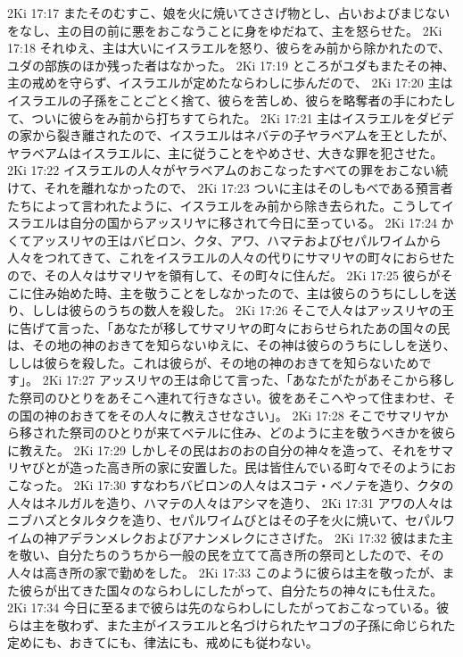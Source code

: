 2Ki 17:17  またそのむすこ、娘を火に焼いてささげ物とし、占いおよびまじないをなし、主の目の前に悪をおこなうことに身をゆだねて、主を怒らせた。
2Ki 17:18  それゆえ、主は大いにイスラエルを怒り、彼らをみ前から除かれたので、ユダの部族のほか残った者はなかった。
2Ki 17:19  ところがユダもまたその神、主の戒めを守らず、イスラエルが定めたならわしに歩んだので、
2Ki 17:20  主はイスラエルの子孫をことごとく捨て、彼らを苦しめ、彼らを略奪者の手にわたして、ついに彼らをみ前から打ちすてられた。
2Ki 17:21  主はイスラエルをダビデの家から裂き離されたので、イスラエルはネバテの子ヤラベアムを王としたが、ヤラベアムはイスラエルに、主に従うことをやめさせ、大きな罪を犯させた。
2Ki 17:22  イスラエルの人々がヤラベアムのおこなったすべての罪をおこない続けて、それを離れなかったので、
2Ki 17:23  ついに主はそのしもべである預言者たちによって言われたように、イスラエルをみ前から除き去られた。こうしてイスラエルは自分の国からアッスリヤに移されて今日に至っている。
2Ki 17:24  かくてアッスリヤの王はバビロン、クタ、アワ、ハマテおよびセパルワイムから人々をつれてきて、これをイスラエルの人々の代りにサマリヤの町々におらせたので、その人々はサマリヤを領有して、その町々に住んだ。
2Ki 17:25  彼らがそこに住み始めた時、主を敬うことをしなかったので、主は彼らのうちにししを送り、ししは彼らのうちの数人を殺した。
2Ki 17:26  そこで人々はアッスリヤの王に告げて言った、「あなたが移してサマリヤの町々におらせられたあの国々の民は、その地の神のおきてを知らないゆえに、その神は彼らのうちにししを送り、ししは彼らを殺した。これは彼らが、その地の神のおきてを知らないためです」。
2Ki 17:27  アッスリヤの王は命じて言った、「あなたがたがあそこから移した祭司のひとりをあそこへ連れて行きなさい。彼をあそこへやって住まわせ、その国の神のおきてをその人々に教えさせなさい」。
2Ki 17:28  そこでサマリヤから移された祭司のひとりが来てベテルに住み、どのように主を敬うべきかを彼らに教えた。
2Ki 17:29  しかしその民はおのおの自分の神々を造って、それをサマリヤびとが造った高き所の家に安置した。民は皆住んでいる町々でそのようにおこなった。
2Ki 17:30  すなわちバビロンの人々はスコテ・ベノテを造り、クタの人々はネルガルを造り、ハマテの人々はアシマを造り、
2Ki 17:31  アワの人々はニブハズとタルタクを造り、セパルワイムびとはその子を火に焼いて、セパルワイムの神アデランメレクおよびアナンメレクにささげた。
2Ki 17:32  彼はまた主を敬い、自分たちのうちから一般の民を立てて高き所の祭司としたので、その人々は高き所の家で勤めをした。
2Ki 17:33  このように彼らは主を敬ったが、また彼らが出てきた国々のならわしにしたがって、自分たちの神々にも仕えた。
2Ki 17:34  今日に至るまで彼らは先のならわしにしたがっておこなっている。彼らは主を敬わず、また主がイスラエルと名づけられたヤコブの子孫に命じられた定めにも、おきてにも、律法にも、戒めにも従わない。

